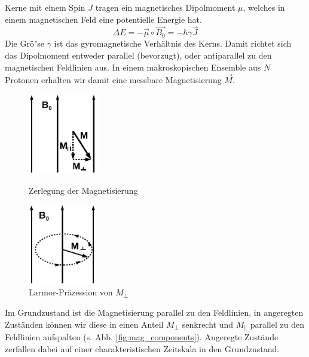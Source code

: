 \documentclass[a4paper]{scrartcl} %
\begin{document}
Kerne mit einem Spin $J$ tragen ein magnetisches Dipolmoment $\mu$, welches in einem magnetischen Feld eine potentielle Energie hat.
\begin{equation}
	\Delta E = - \vec{\mu} \circ \vec{B_0} = - \hbar \gamma \vec{J}
\end{equation}
Die Grö"se $\gamma$ ist das gyromagnetische Verhältnis des Kerns. Damit richtet sich das Dipolmoment entweder parallel (bevorzugt), oder antiparallel zu den magnetischen Feldlinien aus. In einem makroskopischen Ensemble aus $N$ Protonen erhalten wir damit eine messbare Magnetisierung $\vec{M}$.
\begin{figure}[H]
	\centering
	\parbox{70mm}{
		\centering
		\includegraphics[height=35mm]{./Resources/magnetization_components.png}
		\caption{Zerlegung der Magnetisierung \autocite{skript}}
		\label{fig:mag_components}
	}
	\hspace*{\fill}
	\parbox{70mm}{
		\centering
		\includegraphics[height=35mm]{./Resources/larmor_precession.png}
		\caption{Larmor-Präzession von $M_{\perp}$ \autocite{skript}}
		\label{fig:larmor}
	}
\end{figure}

Im Grundzustand ist die Magnetisierung parallel zu den Feldlinien, in angeregten Zuständen können wir diese in einen Anteil $M_{\perp}$ senkrecht und $M_{\parallel}$ parallel zu den Feldlinien aufspalten (s. Abb. \ref{fig:mag_components}). Angeregte Zustände zerfallen dabei auf einer charakteristischen Zeitskala in den Grundzustand.
\end{document}

